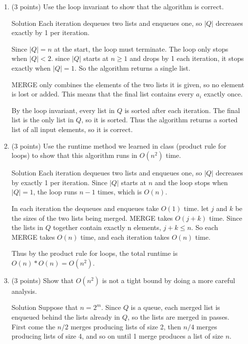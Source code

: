 \documentclass[10pt,letterpaper,unboxed,cm]{article}
\begin{document}
\begin{enumerate}
\begin{enumerate}
\item (3 points)
Use the loop invariant to show that the algorithm is correct.

\begin{frame}{Solution}
    Each iteration dequeues two lists and enqueues one, so \(|Q|\) decreases exactly by 1 per iteration. 

    Since \(|Q| = n\) at the start, the loop must terminate. The loop only stops when \(|Q|<2\). since \(|Q|\) starts at \(n \geq 1\) and drops by 1 each iteration, it stops exactly when \(|Q| = 1\). So the algorithm returns a single list.

    MERGE only combines the elements of the two lists it is given, so no element is lost or added. This means that the final list contains every \(a_i\) exactly once.

    By the loop invariant, every list in \(Q\) is sorted after each iteration. The final list is the only list in \(Q\), so it is sorted. Thus the algorithm returns a sorted list of all input elements, so it is correct.
\end{frame}

\item (3 points)
Use the runtime method we learned in class (product rule for loops) to show that this algorithm runs in $O(n^2)$ time.

\begin{frame}{Solution}
    Each iteration dequeues two lists and enqueues one, so \(|Q|\) decreases by exactly 1 per iteration. Since \(|Q|\) starts at \(n\) and the loop stops when \(|Q| = 1\), the loop runs \(n-1\) times, which is \(O(n)\).

    In each iteration the dequeues and enqueues take \(O(1)\) time. let \(j\) and \(k\) be the sizes of the two lists being merged. MERGE takes \(O(j+k)\) time. Since the lists in \(Q\) together contain exactly n elements, \(j+k \leq n\). So each MERGE  takes \(O(n)\) time, and each iteration takes \(O(n)\) time.

    Thus by the product rule for loops, the total runtime is \(O(n) *O(n) = O(n^2)\).
\end{frame}
\item (3 points) Show that $O(n^2)$ is not a tight bound by doing a more careful analysis.

\begin{frame}{Solution}
    Suppose that \(n = 2^m\). Since \(Q\) is a queue, each merged list is enqueued behind the lists already in \(Q\), so the lists are merged in passes. First come the \(n/2\) merges producing lists of size 2, then \(n/4\) merges producing lists of size 4, and so on until 1 merge produces a list of size \(n\).


\end{frame}
\end{enumerate}
\end{enumerate}
\end{document}
